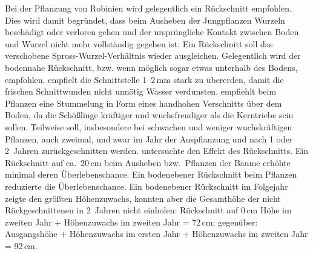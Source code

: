 \documentclass[twocolumn]{scrartcl}
\begin{document}
Bei der Pflanzung von Robinien wird gelegentlich ein Rückschnitt
empfohlen.
Dies wird damit begründet, dass beim Ausheben der Jungpflanzen Wurzeln beschädigt oder verloren gehen
und der ursprüngliche Kontakt zwischen Boden und Wurzel nicht mehr vollständig gegeben ist.
Ein Rückschnitt soll das verschobene Spross-Wurzel-Verhältnis wieder ausgleichen.
Gelegentlich wird der
bodennahe Rückschnitt, bzw. wenn möglich sogar etwas unterhalb des
Bodens, empfohlen. \citet{bier1958robinie} empfielt die Schnittstelle
1--2\,mm stark zu übererden, damit die frischen Schnittwunden nicht
unnötig Wasser verdunsten.
\citet[S.~78]{erteld1952robinieErtrag} empfiehlt beim Pflanzen eine
Stummelung in Form eines handhohen Verschnitts über dem Boden, da die
Schößlinge kräftiger und wuchsfreudiger als die Kerntriebe sein
sollen. Teilweise soll, insbesondere bei schwachen und weniger
wuchskräftigen Pflanzen, auch zweimal, und zwar im Jahr der
Auspflanzung und nach 1 oder 2~Jahren zurückgeschnitten werden.
\citet{meginnis1940robinieRueckschnitt}
untersuchte den Effekt des Rückschnitts. Ein Rückschnitt auf
ca.\ 20\,cm beim Ausheben bzw.\ Pflanzen der Bäume erhöhte minimal
deren Überlebenschance. Ein bodenebener Rückschnitt beim Pflanzen
reduzierte die Überlebenschance. Ein bodenebener Rückschnitt im
Folgejahr zeigte den größten Höhenzuwachs, konnten aber die Gesamthöhe
der nicht Rückgeschnittenen in 2~Jahren nicht einholen:
Rückschnitt auf 0\,cm Höhe im zweiten Jahr + Höhenzuwachs im zweiten Jahr = 72\,cm;
gegenüber: Ausgangshöhe + Höhenzuwachs im ersten Jahr + Höhenzuwachs im zweiten Jahr = 92\,cm.
\end{document}
